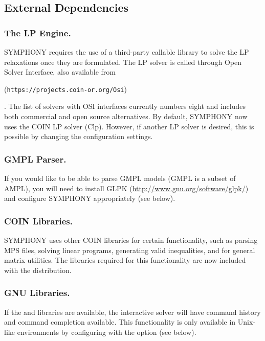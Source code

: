 \subsection{External Dependencies}

\subsubsection{The LP Engine.} SYMPHONY requires the use of a third-party
  callable library to solve the LP relaxations once they are formulated. The
LP solver is called through Open Solver Interface, also available from
\begin{latexonly} 
(\texttt{https://projects.coin-or.org/Osi})
\end{latexonly}.
The list of solvers with OSI interfaces currently numbers eight and includes
both commercial and open source alternatives. By default, SYMPHONY now uses
the COIN LP solver (Clp). However, if another LP solver is desired, this is
possible by changing the configuration settings.

\subsubsection{GMPL Parser.} If you would like to be able to parse GMPL models
(GMPL is a subset of AMPL), you will need to install GLPK
(\url{http://www.gnu.org/software/glpk/}) and configure SYMPHONY appropriately
(see below).

\subsubsection{COIN Libraries.} SYMPHONY uses other COIN libraries for certain
functionality, such as parsing MPS files, solving linear programs, generating
valid inequalities, and for general matrix utilities. The libraries required
for this functionality are now included with the distribution.

\subsubsection{GNU Libraries.} If the  and  libraries
are available, the interactive solver will have command history and command
completion available. This functionality is only available in Unix-like
environments by configuring with the  option (see
below).

